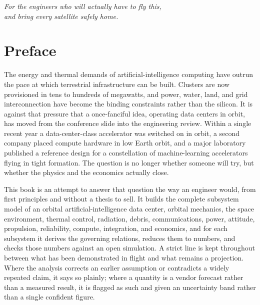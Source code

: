 \thispagestyle{empty}
\vspace*{0.32\textheight}
\begin{center}
{\itshape\large\color{brandGray} For the engineers who will actually have to fly this,\\[4pt]
and bring every satellite safely home.}
\end{center}
\clearpage

{\hypersetup{linkcolor=brandSlate}
\tableofcontents}
\clearpage
\listoffigures
\clearpage
\listoftables
\clearpage

\chapter*{Preface}
The energy and thermal demands of artificial-intelligence computing have outrun the pace at which
terrestrial infrastructure can be built. Clusters are now provisioned in tens to hundreds of megawatts,
and power, water, land, and grid interconnection have become the binding constraints rather than the
silicon. It is against that pressure that a once-fanciful idea, operating data centers in orbit, has
moved from the conference slide into the engineering review. Within a single recent year a
data-center-class accelerator was switched on in orbit, a second company placed compute hardware in low
Earth orbit, and a major laboratory published a reference design for a constellation of machine-learning
accelerators flying in tight formation. The question is no longer whether someone will try, but whether
the physics and the economics actually close.

This book is an attempt to answer that question the way an engineer would, from first principles and
without a thesis to sell. It builds the complete subsystem model of an orbital artificial-intelligence
data center, orbital mechanics, the space environment, thermal control, radiation, debris,
communications, power, attitude, propulsion, reliability, compute, integration, and economics, and for
each subsystem it derives the governing relations, reduces them to numbers, and checks those numbers
against an open simulation. A strict line is kept throughout between what has been demonstrated in flight
and what remains a projection. Where the analysis corrects an earlier assumption or contradicts a widely
repeated claim, it says so plainly; where a quantity is a vendor forecast rather than a measured result,
it is flagged as such and given an uncertainty band rather than a single confident figure.

